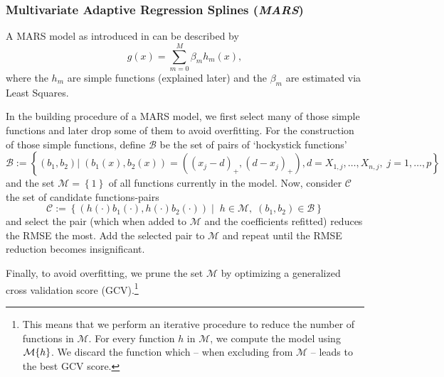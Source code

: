 \subsubsection*{Multivariate Adaptive Regression Splines (\textit{MARS})}{
    A MARS model as introduced in \cite{friedmanMultivariateAdaptiveRegression1991} can be described by 
    \begin{equation}
        \label{eq:mars}
        g(x) = \sum_{m=0}^M \beta_m h_m(x),
    \end{equation}
    where the $h_m$ are simple functions (explained later) and the $\beta_m$ are estimated via Least Squares. 
    
    In the building procedure of a MARS model, we first select many of those simple functions and later drop some of them to avoid overfitting. For the construction of those simple functions, define $\mathcal{B}$ be the set of pairs of `hockystick functions'
    \begin{equation}
        \label{eq:mars_basis_fun}
        \mathcal{B}:=\left\{
            \left(b_1,b_2\right) 
            | \;
            \left(b_1(x),b_2(x)\right) = \left(\left(x_{j}-d\right)_+,\left(d-x_{j}\right)_+\right),
            d =X_{1, j},  \ldots, X_{n, j},\;
            j=1, \ldots, p
        \right\}
    \end{equation}
    and the set $\mathcal{M}=\left\{1\right\}$ of all functions currently in the model. Now, consider $\mathcal{C}$ the set of candidate functions-pairs 
    \begin{equation}
        \label{eq:mars_candidate}
        \mathcal{C}:=\left\{
            \left(h(\cdot)b_1(\cdot),  h(\cdot)b_2(\cdot) \right)
            \;| \;\; h\in\mathcal{M}, \; 
            (b_1,b_2) \in \mathcal{B}
        \right\}
    \end{equation}
    and select the pair (which when added to $\mathcal{M}$ and the coefficients refitted) reduces the RMSE the most. Add the selected pair to $\mathcal{M}$ and repeat until the RMSE reduction becomes insignificant.

    Finally, to avoid overfitting, we prune the set $\mathcal{M}$ by optimizing a generalized cross validation score (GCV).\footnote{This means that we perform an iterative procedure to reduce the number of functions in $\mathcal{M}$. For every function $h$ in $\mathcal{M}$, we compute the model using $\mathcal{M}\\\{h\}$. We discard the function which -- when excluding from $\mathcal{M}$ -- leads to the best GCV score.}  

}
